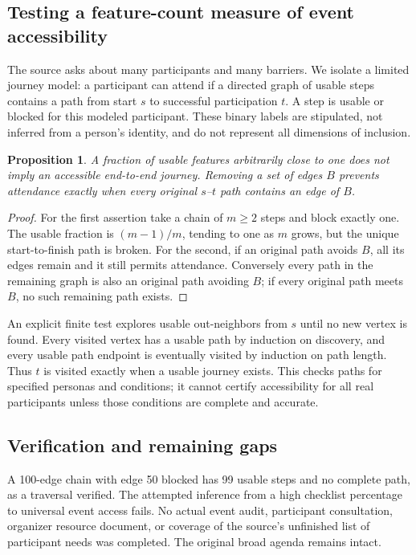 \documentclass[11pt]{article}
\newtheorem{proposition}{Proposition}
\begin{document}
\subsection{Testing a feature-count measure of event accessibility}
The source asks about many participants and many barriers. We isolate a limited journey model: a participant can attend if a directed graph of usable steps contains a path from start $s$ to successful participation $t$. A step is usable or blocked for this modeled participant. These binary labels are stipulated, not inferred from a person's identity, and do not represent all dimensions of inclusion.
\begin{proposition}
A fraction of usable features arbitrarily close to one does not imply an accessible end-to-end journey. Removing a set of edges $B$ prevents attendance exactly when every original $s$--$t$ path contains an edge of $B$.
\end{proposition}
\begin{proof}
For the first assertion take a chain of $m\ge2$ steps and block exactly one. The usable fraction is $(m-1)/m$, tending to one as $m$ grows, but the unique start-to-finish path is broken. For the second, if an original path avoids $B$, all its edges remain and it still permits attendance. Conversely every path in the remaining graph is also an original path avoiding $B$; if every original path meets $B$, no such remaining path exists.
\end{proof}
An explicit finite test explores usable out-neighbors from $s$ until no new vertex is found. Every visited vertex has a usable path by induction on discovery, and every usable path endpoint is eventually visited by induction on path length. Thus $t$ is visited exactly when a usable journey exists. This checks paths for specified personas and conditions; it cannot certify accessibility for all real participants unless those conditions are complete and accurate.
\subsection{Verification and remaining gaps}
A 100-edge chain with edge 50 blocked has 99 usable steps and no complete path, as a traversal verified. The attempted inference from a high checklist percentage to universal event access fails. No actual event audit, participant consultation, organizer resource document, or coverage of the source's unfinished list of participant needs was completed. The original broad agenda remains intact.
\end{document}
